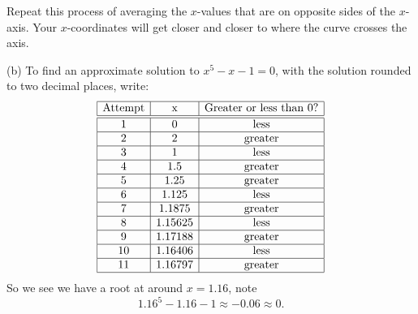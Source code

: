 \documentclass{ximera}
\begin{document}
\begin{question}
\begin{freeResponse}
    Repeat this process of averaging the $x$-values that are on
    opposite sides of the $x$-axis. Your $x$-coordinates will get closer
    and closer to where the curve crosses the axis.



    (b) To find an approximate  solution to $x^5-x-1=0$, with the solution rounded to
    two decimal places, write:
    \[
    \begin{array}{|c|c|c|c|}\hline
      \text{Attempt} & \text{x} & \text{Greater or less than $0$?} \\ \hline\hline
      1 & 0 & \text{less} \\ \hline
      2 & 2 & \text{greater}  \\ \hline
      3 & 1 & \text{less}  \\ \hline
      4 & 1.5 & \text{greater}  \\ \hline
      5 & 1.25 & \text{greater}  \\ \hline
      6 & 1.125 & \text{less}  \\ \hline
      7 & 1.1875 & \text{greater}  \\ \hline
      8 & 1.15625 & \text{less}  \\ \hline
      9 & 1.17188 & \text{greater} \\ \hline
      10 & 1.16406 & \text{less} \\ \hline
      11 & 1.16797 & \text{greater} \\ \hline
    \end{array}
    \]
    So we see we have a root at around $x=1.16$, note
    \[
    1.16^5 - 1.16 -1 \approx  -0.06 \approx 0.
    \]
  \end{freeResponse}
\end{question}
\mynewpage
\end{document}

